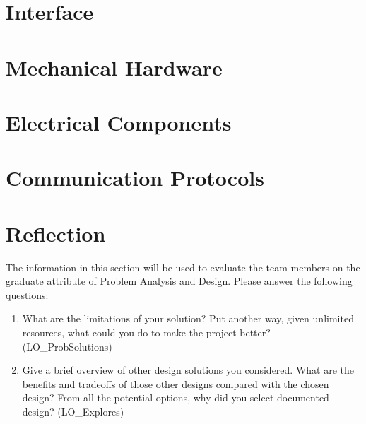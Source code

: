 \documentclass[12pt, titlepage]{article}
\begin{document}
\newpage{}

\appendix

\section{Interface}


\section{Mechanical Hardware}

\section{Electrical Components}

\section{Communication Protocols}

\section{Reflection}

The information in this section will be used to evaluate the team members on the
graduate attribute of Problem Analysis and Design.  Please answer the following questions:

\begin{enumerate}
  \item What are the limitations of your solution?  Put another way, given
  unlimited resources, what could you do to make the project better? (LO\_ProbSolutions)
  \item Give a brief overview of other design solutions you considered.  What
  are the benefits and tradeoffs of those other designs compared with the chosen
  design?  From all the potential options, why did you select documented design?
  (LO\_Explores)
\end{enumerate}
\end{document}
